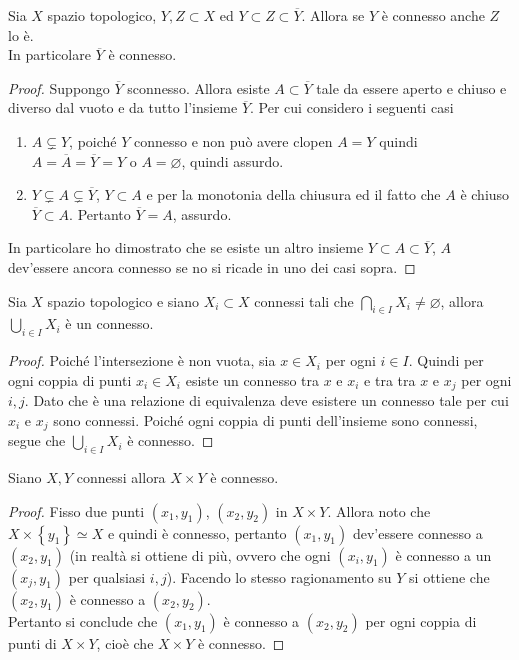 \begin{theorem}
	Sia $X$ spazio topologico, $Y, Z \subset X$ ed $Y \subset Z\subset \overline{Y}$. Allora se $Y$ è connesso anche $Z$ lo è. \\ In particolare $\overline{Y}$ è connesso.
\end{theorem} 
\begin{proof}
	Suppongo $\overline{Y}$ sconnesso. Allora esiste $A \subset \overline{Y}$ tale da essere aperto e chiuso e diverso dal vuoto e da tutto l'insieme $\overline{Y}$. Per cui considero i seguenti casi
	\begin{enumerate}
		\item $A \subsetneq Y$, poiché $Y$ connesso e non può avere clopen $A = Y$ quindi $A = \overline{A} = \overline{Y} = Y$ o $A = \varnothing$, quindi assurdo.
		\item $Y \subsetneq A \subsetneq \overline{Y}$, $Y \subset A$ e per la monotonia della chiusura ed il fatto che $A$ è chiuso $\overline{Y} \subset A$. Pertanto $\overline{Y}= A$, assurdo. 
	\end{enumerate}
	In particolare ho dimostrato che se esiste un altro insieme $Y \subset A \subset \overline{Y}$, $A$ dev'essere ancora connesso se no si ricade in uno dei casi sopra.
\end{proof}

\begin{theorem}
	Sia $X$ spazio topologico e siano $X_i \subset X$ connessi tali che $\bigcap_{i \in I} X_i \neq \varnothing$, allora $\bigcup_{i \in I} X_i$ è un connesso. 
\end{theorem} 
\begin{proof}
	Poiché l'intersezione è non vuota, sia $x \in X_i$ per ogni $i \in I$. Quindi per ogni coppia di punti $x_i \in X_i$ esiste un connesso tra $x$ e $x_i$ e tra tra $x$ e $x_j$ per ogni $i, j$. Dato che è una relazione di equivalenza deve esistere un connesso tale per cui $x_i$ e $x_j$ sono connessi. Poiché ogni coppia di punti dell'insieme sono connessi, segue che $\bigcup_{i \in I} X_i$ è connesso.
\end{proof}

\begin{theorem}
	Siano $X, Y$ connessi allora $X\times Y$ è connesso. 
\end{theorem} 
\begin{proof}
	Fisso due punti $(x_1, y_1)$, $(x_2, y_2)$ in $X \times Y$. Allora noto che $X \times \left\{y_1\right\} \simeq X$ e quindi è connesso, pertanto $(x_1, y_1)$ dev'essere connesso a $(x_2, y_1)$ (in realtà si ottiene di più, ovvero che ogni $(x_i, y_1)$ è connesso a un $(x_j, y_1)$ per qualsiasi $i,j$). Facendo lo stesso ragionamento su $Y$ si ottiene che $(x_2, y_1)$ è connesso a $(x_2, y_2)$. \\ Pertanto si conclude che $(x_1, y_1)$ è connesso a $(x_2, y_2)$ per ogni coppia di punti di $X \times Y$, cioè che $X \times Y$ è connesso.
\end{proof}



